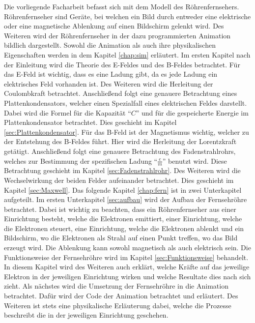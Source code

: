 Die vorliegende Facharbeit befasst sich mit dem Modell des Röhrenfernsehers.
Röhrenfernseher sind Geräte, bei welchen ein Bild durch entweder eine elektrische oder eine magnetische Ablenkung auf einen Bildschirm gelenkt wird.
Des Weiteren wird der Röhrenfernseher in der dazu programmierten Animation bildlich dargestellt.
Sowohl die Animation als auch ihre physikalischen Eigenschaften werden in dem Kapitel \ref{chap:sim} erläutert.
Im ersten Kapitel nach der Einleitung wird die Theorie des E-Feldes und des B-Feldes betrachtet.
Für das E-Feld ist wichtig, dass es eine Ladung gibt, da es jede Ladung ein elektrisches Feld vorhanden ist.
Des Weiteren wird die Herleitung der Coulombkraft betrachtet.
Anschließend folgt eine genauere Betrachtung eines Plattenkondensators, welcher einen Spezialfall eines elektrischen Feldes darstellt.
Dabei wird die Formel für die Kapazität "`$C$"' und für die gespeicherte Energie im Plattenkondensator betrachtet.
Dies geschieht im Kapitel \ref{sec:Plattenkondensator}.
Für das B-Feld ist der Magnetismus wichtig, welcher zu der Entstehung des B-Feldes führt.
Hier wird die Herleitung der Lorentzkraft getätigt.
Anschließend folgt eine genauere Betrachtung des Fadenstrahlrohrs, welches zur Bestimmung der spezifischen Ladung "`$\frac{e}{m}$"' benutzt wird.
Diese Betrachtung geschieht im Kapitel \ref{sec:Fadenstrahlrohr}.
Des Weiteren wird die Wechselwirkung der beiden Felder aufeinander betrachtet.
Dies geschieht im Kapitel \ref{sec:Maxwell}.
Das folgende Kapitel \ref{chap:fern} ist in zwei Unterkapitel aufgeteilt.
Im ersten Unterkapitel \ref{sec:aufbau} wird der Aufbau der Fernsehröhre betrachtet.
Dabei ist wichtig zu beachten, dass ein Röhrenfernseher aus einer Einrichtung besteht, welche die Elektronen emittiert, einer Einrichtung, welche die Elektronen steuert, eine Einrichtung, welche die Elektronen ablenkt und ein Bildschirm, wo die Elektronen als Strahl auf einen Punkt treffen, wo das Bild erzeugt wird.
Die Ablenkung kann sowohl magnetisch als auch elektrisch sein.
Die Funktionsweise der Fernsehröhre wird im Kapitel \ref{sec:Funktionsweise} behandelt.
In diesem Kapitel wird des Weiteren auch erklärt, welche Kräfte auf das jeweilige Elektron in der jeweiligen Einrichtung wirken und welche Resultate dies nach sich zieht.
Als nächstes wird die Umsetzung der Fernsehröhre in die Animation betrachtet.
Dafür wird der Code der Animation betrachtet und erläutert.
Des Weiteren ist stets eine physikalische Erläuterung dabei, welche die Prozesse beschreibt die in der jeweiligen Einrichtung geschehen.
